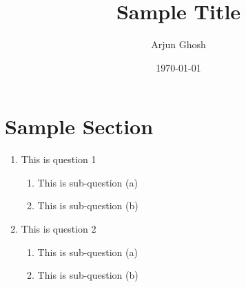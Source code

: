 \documentclass[12pt]{article}
\title{Sample Title}
\author{Arjun Ghosh}
\date{\today}
\begin{document}
\maketitle

\section*{Sample Section}

\begin{enumerate}
	\item This is question 1
		\begin{enumerate}
			\item This is sub-question (a)
			\item This is sub-question (b)
		\end{enumerate}

	\item This is question 2
		\begin{enumerate}
			\item	 This is sub-question (a)
			\item This is sub-question (b)
		\end{enumerate}
\end{enumerate}
\end{document}
